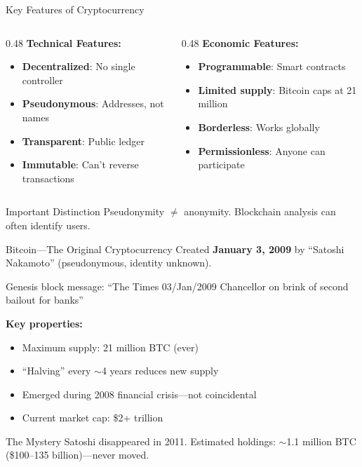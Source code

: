 ﻿\documentclass[aspectratio=169,11pt]{beamer}
\begin{document}
\begin{frame}{Key Features of Cryptocurrency}
\begin{columns}[T]
\begin{column}{0.48\textwidth}
\textbf{Technical Features:}
\begin{itemize}
    \item \textbf{Decentralized}: No single controller
    \item \textbf{Pseudonymous}: Addresses, not names
    \item \textbf{Transparent}: Public ledger
    \item \textbf{Immutable}: Can't reverse transactions
\end{itemize}
\end{column}
\begin{column}{0.48\textwidth}
\textbf{Economic Features:}
\begin{itemize}
    \item \textbf{Programmable}: Smart contracts
    \item \textbf{Limited supply}: Bitcoin caps at 21 million
    \item \textbf{Borderless}: Works globally
    \item \textbf{Permissionless}: Anyone can participate
\end{itemize}
\end{column}
\end{columns}

\vspace{0.5em}
\begin{alertblock}{Important Distinction}
Pseudonymity $\neq$ anonymity. Blockchain analysis can often identify users.
\end{alertblock}
\end{frame}

\begin{frame}{Bitcoin---The Original Cryptocurrency}
Created \textbf{January 3, 2009} by ``Satoshi Nakamoto'' \parencite{nakamoto_bitcoin} (pseudonymous, identity unknown).

\begin{quotebox}
Genesis block message: ``The Times 03/Jan/2009 Chancellor on brink of second bailout for banks''
\end{quotebox}

\vspace{0.3em}
\textbf{Key properties:}
\begin{itemize}
    \item Maximum supply: 21 million BTC (ever)
    \item ``Halving'' every $\sim$4 years reduces new supply
    \item Emerged during 2008 financial crisis---not coincidental
    \item Current market cap: \$2+ trillion
\end{itemize}

\begin{alertblock}{The Mystery}
Satoshi disappeared in 2011. Estimated holdings: $\sim$1.1 million BTC (\$100--135 billion)---never moved.
\end{alertblock}
\end{frame}
\end{document}
